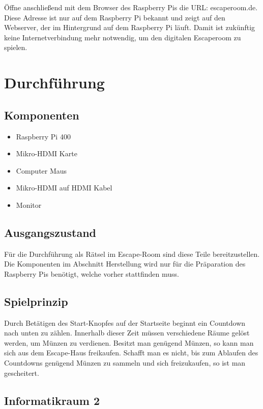 \documentclass[12pt, letterpaper]{article}
\begin{document}
Öffne anschließend mit dem Browser des Raspberry Pis die URL: escaperoom.de.
Diese Adresse ist nur auf dem Raspberry Pi bekannt und zeigt auf den Webserver, der im Hintergrund auf dem Raspberry Pi läuft.
Damit ist zukünftig keine Internetverbindung mehr notwendig, um den digitalen Escaperoom zu spielen.

\section{Durchführung}
\subsection{Komponenten}

\begin{itemize}
	\item Raspberry Pi 400
    \item Mikro-HDMI Karte
	\item Computer Maus
	\item Mikro-HDMI auf HDMI Kabel
	\item Monitor
\end{itemize}

\subsection{Ausgangszustand}

Für die Durchführung als Rätsel im Escape-Room sind diese Teile bereitzustellen.
Die Komponenten im Abschnitt Herstellung wird nur für die Präparation des Raspberry Pis benötigt, welche vorher stattfinden muss.

\subsection{Spielprinzip}

Durch Betätigen des Start-Knopfes auf der Startseite beginnt ein Countdown nach unten zu zählen.
Innerhalb dieser Zeit müssen verschiedene Räume gelöst werden, um Münzen zu verdienen.
Besitzt man genügend Münzen, so kann man sich aus dem Escape-Haus freikaufen.
Schafft man es nicht, bis zum Ablaufen des Countdowns genügend Münzen zu sammeln und sich freizukaufen, so ist man gescheitert.

\subsection{Informatikraum 2}
\end{document}
